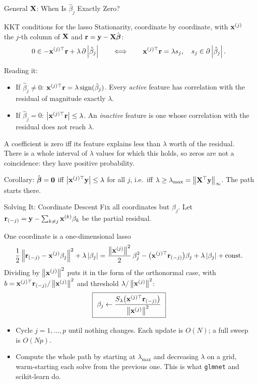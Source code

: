 \documentclass[11pt,aspectratio=169]{beamer}
\begin{document}
\begin{frame}{General $\mathbf{X}$: When Is $\hat\beta_j$ Exactly Zero?}\small
\begin{derivation}{KKT conditions for the lasso}
Stationarity, coordinate by coordinate, with $\mathbf{x}^{(j)}$ the $j$-th column of $\mathbf{X}$ and $\mathbf{r}=\mathbf{y}-\mathbf{X}\hat{\boldsymbol{\beta}}$:
\[
0\in-\mathbf{x}^{(j)\top}\mathbf{r}+\lambda\,\partial\left\lvert \hat\beta_j \right\rvert
\qquad\Longleftrightarrow\qquad
\mathbf{x}^{(j)\top}\mathbf{r}=\lambda s_j,\quad s_j\in\partial\left\lvert \hat\beta_j \right\rvert.
\]
\end{derivation}
Reading it:
\begin{itemize}
  \item If $\hat\beta_j\neq0$: $\mathbf{x}^{(j)\top}\mathbf{r}=\lambda\operatorname{sign}(\hat\beta_j)$. Every \emph{active} feature has correlation
        with the residual of magnitude exactly $\lambda$.
  \item If $\hat\beta_j=0$: $\left\lvert \mathbf{x}^{(j)\top}\mathbf{r} \right\rvert\le\lambda$. An \emph{inactive} feature is one whose correlation
        with the residual does not reach $\lambda$.
\end{itemize}
\begin{keypoint}
A coefficient is zero iff its feature explains less than $\lambda$ worth of the residual. There is a whole
interval of $\lambda$ values for which this holds, so zeros are not a coincidence: they have positive probability.
\end{keypoint}
Corollary: $\hat{\boldsymbol{\beta}}=\mathbf{0}$ iff $\left\lvert \mathbf{x}^{(j)\top}\mathbf{y} \right\rvert\le\lambda$ for all $j$, i.e.\ iff $\lambda\ge\lambda_{\max}=\left\lVert \mathbf{X}^{\top}\mathbf{y} \right\rVert_\infty$.
The path starts there.
\end{frame}

\begin{frame}{Solving It: Coordinate Descent}\footnotesize
Fix all coordinates but $\beta_j$. Let $\mathbf{r}_{(-j)}=\mathbf{y}-\sum_{k\ne j}\mathbf{x}^{(k)}\beta_k$ be the partial residual.
\begin{derivation}{One coordinate is a one-dimensional lasso}
\[
\frac12\left\lVert \mathbf{r}_{(-j)}-\mathbf{x}^{(j)}\beta_j \right\rVert^2+\lambda\left\lvert \beta_j \right\rvert
=\frac{\left\lVert \mathbf{x}^{(j)} \right\rVert^2}{2}\,\beta_j^2-\bigl(\mathbf{x}^{(j)\top}\mathbf{r}_{(-j)}\bigr)\beta_j+\lambda\left\lvert \beta_j \right\rvert+\text{const}.
\]
Dividing by $\left\lVert \mathbf{x}^{(j)} \right\rVert^2$ puts it in the form of the orthonormal case, with $b=\mathbf{x}^{(j)\top}\mathbf{r}_{(-j)}/\left\lVert \mathbf{x}^{(j)} \right\rVert^2$
and threshold $\lambda/\left\lVert \mathbf{x}^{(j)} \right\rVert^2$:
\[
\boxed{\ \beta_j\leftarrow\frac{S_\lambda\bigl(\vx^{(j)\top}\vr_{(-j)}\bigr)}{\norm{\vx^{(j)}}^2}\ }
\]
\end{derivation}
\begin{itemize}
  \item Cycle $j=1,\dots,p$ until nothing changes. Each update is $O(N)$; a full sweep is $O(Np)$.
  \item Compute the whole path by starting at $\lambda_{\max}$ and decreasing $\lambda$ on a grid, warm-starting
        each solve from the previous one. This is what \texttt{glmnet} and scikit-learn do.
\end{itemize}
\end{frame}
\end{document}
